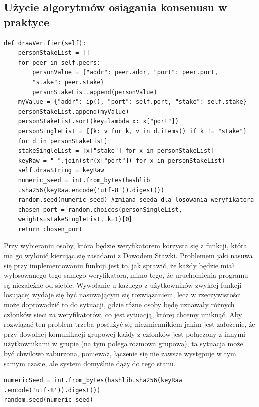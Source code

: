 \subsection{Użycie algorytmów osiągania konsenusu w praktyce}
\begin{lstlisting}[caption={Wybieranie osoby mającej zostać weryfikatorem}]
def drawVerifier(self):
    personStakeList = []
    for peer in self.peers:
        personValue = {"addr": peer.addr, "port": peer.port,
        "stake": peer.stake}
        personStakeList.append(personValue)
    myValue = {"addr": ip(), "port": self.port, "stake": self.stake}
    personStakeList.append(myValue)
    personStakeList.sort(key=lambda x: x["port"])
    personSingleList = [{k: v for k, v in d.items() if k != "stake"} 
    for d in personStakeList]
    stakeSingleList = [x["stake"] for x in personStakeList]
    keyRaw = " ".join(str(x["port"]) for x in personStakeList)
    self.drawString = keyRaw
    numeric_seed = int.from_bytes(hashlib
    .sha256(keyRaw.encode('utf-8')).digest())
    random.seed(numeric_seed) #zmiana seeda dla losowania weryfikatora
    chosen_port = random.choices(personSingleList, 
    weights=stakeSingleList, k=1)[0]
    return chosen_port
\end{lstlisting}
Przy wybieraniu osoby, która będzie weryfikatorem korzysta się z funkcji, która ma go wyłonić kierując się zasadami z Dowodem Stawki. Problemem jaki nasuwa się przy implementowaniu funkcji jest to, jak sprawić, że każdy będzie miał wylosowanego tego samego weryfikatora, mimo tego, że uruchomienia programu są niezależne od siebie. Wywołanie u każdego z użytkowników zwykłej funkcji losującej wydaje się być nasuwającym się rozwiązaniem, lecz w rzeczywistości może doprowadzić to do sytuacji, gdzie różne osoby będę uznawały różnych członków sieci za weryfikatorów, co jest sytuacją, której chcemy uniknąć. Aby rozwiązać ten problem trzeba posłużyć się niezmiennikiem jakim jest założenie, że przy dowolnej komunikacji grupowej każdy z członków jest połączony z innymi użytkownikami w grupie (na tym polega rozmowa grupowa), ta sytuacja może być chwilowo zaburzona, ponieważ, łączenie się nie zawsze występuje w tym samym czasie, ale system domyślnie dąży do tego stanu.

\begin{lstlisting}[caption={Zamiana łańcucha znaków na wartość liczbową}]
numericSeed = int.from_bytes(hashlib.sha256(keyRaw
.encode('utf-8')).digest())
random.seed(numeric_seed)
\end{lstlisting}

